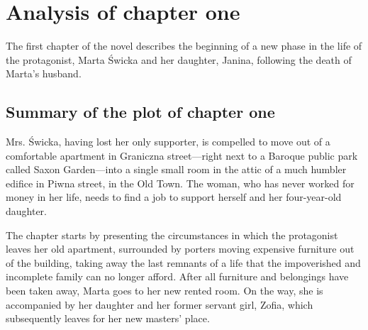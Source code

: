 


\section{Analysis of chapter one}

The first chapter of the novel describes the beginning of a new phase in the life of the protagonist, Marta Świcka and her daughter, Janina, following the death of Marta's husband.

\subsection{Summary of the plot of chapter one}
Mrs. Świcka, having lost her only supporter, is compelled to move out of a comfortable apartment in Graniczna street---right next to a Baroque public park called Saxon Garden---into a single small room in the attic of a much humbler edifice in Piwna street, in the Old Town.
The woman, who has never worked for money in her life, needs to find a job to support herself and her four-year-old daughter.

The chapter starts by presenting the circumstances in which the protagonist leaves her old apartment, surrounded by porters moving expensive furniture out of the building, taking away the last remnants of a life that the impoverished and incomplete family can no longer afford.
After all furniture and belongings have been taken away, Marta goes to her new rented room.
On the way, she is accompanied by her daughter and her former servant girl, Zofia, which subsequently leaves for her new masters' place.

